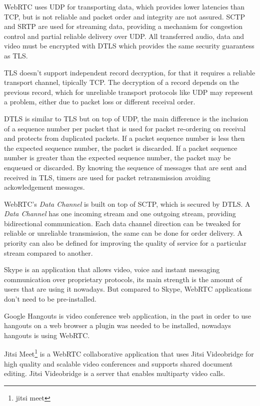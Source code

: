 \ac{WebRTC} uses \ac{UDP} for transporting data, which provides lower latencies than \ac{TCP}, but is not reliable and packet order and integrity are not assured. \ac{SCTP} and \ac{SRTP} are used for streaming data, providing a mechanism for congestion control and partial reliable delivery over \ac{UDP}. All transferred audio, data and video must be encrypted with \ac{DTLS} which provides the same security guarantess as \ac{TLS}. 

\ac{TLS} doesn't support independent record decryption, for that it requires a reliable transport channel, tipically \ac{TCP}. The decryption of a record depends on the previous record, which for unreliable transport protocols like \ac{UDP} may represent a problem, either due to packet loss or different receival order.

\ac{DTLS} is similar to \ac{TLS} but on top of \ac{UDP}, the main difference is the inclusion of a sequence number per packet that is used for packet re-ordering on receival and protects from duplicated packets. If a packet sequence number is less then the expected sequence number, the packet is discarded. If a packet sequence number is greater than the expected sequence number, the packet may be enqueued or discarded. By knowing the sequence of messages that are sent and received in \ac{TLS}, timers are used for packet retransmission avoiding ackowledgement messages.

\ac{WebRTC}'s \textit{Data Channel} is built on top of \ac{SCTP}, which is secured by \ac{DTLS}. A \textit{Data Channel} has one incoming stream and one outgoing stream, providing bidirectional communication. Each data channel direction can be tweaked for reliable or unreliable transmission, the same can be done for order delivery. A priority can also be defined for improving the quality of service for a particular stream compared to another.

Skype is an application that allows video, voice and instant messaging communication over proprietary protocols, its main strength is the amount of users that are using it nowadays. But compared to Skype, \ac{WebRTC} applications don't need to be pre-installed.

Google Hangouts is video conference web application, in the past in order to use hangouts on a web browser a plugin was needed to be installed, nowadays hangouts is using \ac{WebRTC}.

Jitsi Meet\footnote{jitsi meet} is a \ac{WebRTC} collaborative application that uses Jitsi Videobridge for high quality and scalable video conferences and supports shared document editing. Jitsi Videobridge is a server that enables multiparty video calls.





